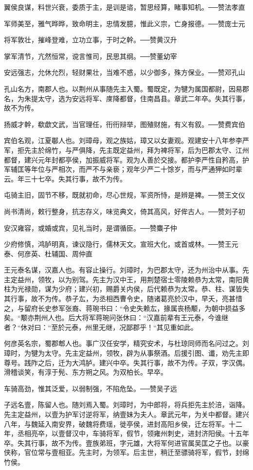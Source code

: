 \documentclass[12pt,UTF8]{ctexbook}
\begin{document}
翼侯良谋，料世兴衰，委质于主，是训是谘，暂思经算，睹事知机。──赞法孝直

军师美至，雅气晔晔，致命明主，忠情发臆，惟此义宗，亡身报德。──赞庞士元

将军敦壮，摧峰登难，立功立事，于时之幹。──赞黄汉升

掌军清节，亢然恒常，谠言惟司，民思其纲。──赞董幼宰

安远强志，允休允烈，轻财果壮，当难不惑，以少御多，殊方保业。──赞邓孔山

孔山名方，南郡人也。以荆州从事随先主入蜀。蜀既定，为犍为属国都尉，因易郡名，为朱提太守，选为安远将军、庲降都督，住南昌县。章武二年卒。失其行事，故不为传。

扬威才幹，欷歔文武，当官理任，衎衎辩举，图殖财施，有义有叙。──赞费宾伯

宾伯名观，江夏鄳人也。刘璋母，观之族姑，璋又以女妻观。观建安十八年参李严军，拒先主於绵竹，与严俱降，先主既定益州，拜为裨将军，后为巴郡太守、江州都督，建兴元年封都亭侯，加振威将军。观为人善於交接。都护李严性自矜高，护军辅匡等年位与严相次，而严不与亲亵；观年少严二十馀岁，而与严通狎如时辈云。年三十七卒。失其行事，故不为传。

屯骑主旧，固节不移，既就初命，尽心世规，军资所恃，是辨是裨。──赞王文仪

尚书清尚，敕行整身，抗志存义，味览典文，倚其高风，好侔古人。──赞刘子初

安汉雍容，或婚或宾，见礼当时，是谓循臣。──赞麋子仲

少府修慎，鸿胪明真，谏议隐行，儒林天文。宣班大化，或首或林。──赞王元泰、何彦英、杜辅国、周仲直

王元泰名谋，汉嘉人也。有容止操行。刘璋时，为巴郡太守，还为州治中从事。先主定益州，领牧，以为别驾。先主为汉中王，用荆楚宿士零陵赖恭为太常，南阳黄柱为光禄勋，谋为少府；建兴初，赐爵关内侯，后代赖恭为太常。恭、柱、谋皆失其行事，故不为传。恭子厷，为丞相西曹令史，随诸葛亮於汉中，早夭，亮甚惜之，与留府长史参军张裔、蒋琬书曰：“令史失赖厷，掾属丧杨颙，为朝中损益多矣。“颙亦荆州人也。后大将军蒋琬问张休曰：“汉嘉前辈有王元泰，今谁继者？“休对曰：“至於元泰，州里无继，况鄙郡乎！“其见重如此。

何彦英名宗，蜀郡郫人也。事广汉任安学，精究安术，与杜琼同师而名问过之。刘璋时，为犍为太守。先主定益州，领牧，辟为从事祭酒。后援引图、谶，劝先主即尊号。践阼之后，迁为大鸿胪。建兴中卒。失其行事，故不为传。子双，字汉偶。滑稽谈笑，有淳于髡、东方朔之风。为双柏长。早卒。

车骑高劲，惟其泛爱，以弱制强，不陷危坠。──赞吴子远

子远名壹，陈留人也。随刘焉入蜀。刘璋时，为中郎将，将兵拒先主於涪，诣降。先主定益州，以壹为护军讨逆将军，纳壹妹为夫人。章武元年，为关中都督。建兴八年，与魏延入南安界，破魏将费瑶，徙亭侯，进封高阳乡侯，迁左将军。十二年，丞相亮卒，以壹督汉中，车骑将军，假节，领雍州刺史，进封济阳侯。十五年卒。失其行事，故不为传。壹族弟班，字元雄，大将军何进官属吴匡之子也。以豪侠称，官位常与壹相亚。先主时，为领军。后主世，稍迁至骠骑将军，假节，封绵竹侯。
\end{document}
